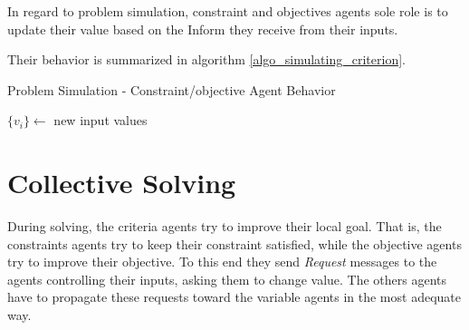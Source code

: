 In regard to problem simulation, constraint and objectives agents sole role is to update their value based on the Inform they receive from their inputs.

Their behavior is summarized in algorithm \ref{algo_simulating_criterion}.

\begin{algorithm}
\caption{Problem Simulation - Constraint/objective Agent Behavior}
\label{algo_simulating_criterion}
\begin{algorithmic}
	$\{v_i\} \leftarrow$ new input values\;
			
\end{algorithmic}
\end{algorithm}

\section{Collective Solving}\label{collective_solv}

During solving, the criteria agents try to improve their local goal. That is, the constraints agents try to keep their constraint satisfied, while the objective agents try to improve their objective. To this end they send \emph{Request} messages to the agents controlling their inputs, asking them to change value. The others agents have to propagate these requests toward the variable agents in the most adequate way.

